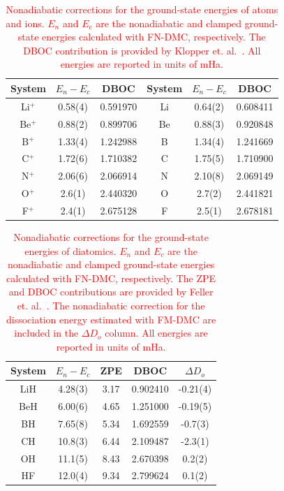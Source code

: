 \documentclass[aip,jcp,numerical,reprint]{revtex4-1}
\begin{document}
\begin{table}[h]
\setlength{\extrarowheight}{1pt}
\caption{\textcolor{red}{Nonadiabatic corrections for the ground-state energies of atoms and ions. $E_n$ and $E_c$ are the nonadiabatic and clamped ground-state energies calculated with FN-DMC, respectively. The DBOC contribution is provided by Klopper et. al.~\cite{Klopper_IP}. All energies are reported in units of mHa.}\label{tab:nad-ad-atoms}}
\begin{tabular}{ccc|ccc}
\hline\hline
System & $E_n-E_c$&  DBOC     & System & $E_n-E_c$&  DBOC \\ \hline
Li$^+$ &  0.58(4) &  0.591970 & Li     &  0.64(2) &  0.608411 \\
Be$^+$ &  0.88(2) &  0.899706 & Be     &  0.88(3) &  0.920848 \\
B$^+$  &  1.33(4) &  1.242988 & B      &  1.34(4) &  1.241669 \\
C$^+$  &  1.72(6) &  1.710382 & C      &  1.75(5) &  1.710900 \\
N$^+$  &  2.06(6) &  2.066914 & N      &  2.10(8) &  2.069149 \\
O$^+$  &  2.6(1)  &  2.440320 & O      &  2.7(2)  &  2.441821 \\
F$^+$  &  2.4(1)  &  2.675128 & F      &  2.5(1)  &  2.678181 \\
\hline\hline
\end{tabular}
\end{table}

\begin{table}[h]
\setlength{\extrarowheight}{1pt}
\caption{\textcolor{red}{Nonadiabatic corrections for the ground-state energies of diatomics. $E_n$ and $E_c$ are the nonadiabatic and clamped ground-state energies calculated with FN-DMC, respectively. The ZPE and DBOC contributions are provided by Feller et. al.~\cite{Feller_Corrections}. The nonadiabatic correction for the dissociation energy estimated with FM-DMC are included in the $\Delta D_o$ column. All energies are reported in units of mHa.}\label{tab:nad-ad-diatomics}}
\begin{tabular}{ccccc}
\hline\hline
System & $E_n-E_c$ &   ZPE &      DBOC & $\Delta D_o$\\ \hline
LiH  &   4.28(3)   &  3.17 &  0.902410 & -0.21(4) \\
BeH  &   6.00(6)   &  4.65 &  1.251000 & -0.19(5) \\
BH   &   7.65(8)   &  5.34 &  1.692559 & -0.7(3) \\
CH   &   10.8(3)   &  6.44 &  2.109487 & -2.3(1) \\
OH   &   11.1(5)   &  8.43 &  2.670398 &  0.2(2) \\
HF   &   12.0(4)   &  9.34 &  2.799624 &  0.1(2) \\
\hline\hline
\end{tabular}
\end{table}
\end{document}
